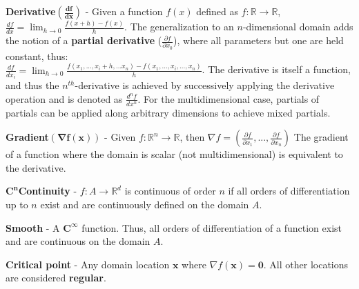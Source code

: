 \begin{defn}
\textbf{Derivative}$\mathbf{(\frac{df}{dx})}$ - Given a function $f(x)$ defined
 as $f : \mathbb{R} \rightarrow \mathbb{R}$, \\
 $\frac{df}{dx} = \lim_{h\rightarrow 0}\frac{f(x+h)-f(x)}{h}$.
 The generalization to an $n$-dimensional domain adds the notion of a \textbf{partial derivative} ($\frac{\partial f}{\partial x_0}$), where all parameters but one are held constant, thus:\\
 $\frac{df}{dx_i} = \lim_{h\rightarrow 0}\frac{f(x_1,...,x_i+h,...x_n)-f(x_1,...,x_i,...,x_n)}{h}$.
 The derivative is itself a function, and thus the $n^{th}$-derivative is achieved by successively applying the derivative operation and is denoted as $\frac{d^nf}{dx^n}$.
 For the multidimensional case, partials of partials can be applied along arbitrary dimensions to achieve mixed partials.
\end{defn}

\begin{defn}
  \textbf{Gradient}$\mathbf{(\nabla f(\mathbf{x}))}$ - Given $f : \mathbb{R}^n \rightarrow \mathbb{R}$, then $\nabla f = \left(\frac{\partial f}{\partial
  x_1},...,\frac{\partial f}{\partial x_{n}}\right)$
  The gradient of a function where the domain is scalar (not multidimensional) is equivalent to the derivative.
\end{defn}

\begin{defn}
  $\mathbf{C^n}$\textbf{Continuity} - $f : A \rightarrow \mathbb{R}^d$ is
  continuous of order $n$ if all orders of differentiation up to $n$ exist and
  are continuously defined on the domain $A$.
\end{defn}

\begin{defn}
  \textbf{Smooth} - A $\mathbf{C^\infty}$ function. Thus, all orders of
  differentiation of a function exist and are continuous on the domain $A$.
\end{defn}

\begin{defn}
  \textbf{Critical point} - Any domain location $\mathbf{x}$ where $\nabla
  f(\mathbf{x}) = \mathbf{0}$. All other locations are considered
  \textbf{regular}.
\end{defn}

